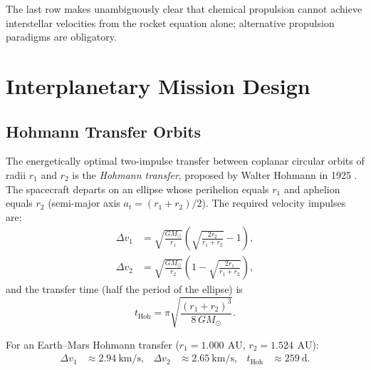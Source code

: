 \documentclass[12pt,a4paper]{article}
\newcommand{\AU}{\,\text{AU}}
\begin{document}
The last row makes unambiguously clear that chemical propulsion cannot achieve
interstellar velocities from the rocket equation alone; alternative
propulsion paradigms are obligatory.

\section{Interplanetary Mission Design}

\subsection{Hohmann Transfer Orbits}

The energetically optimal two-impulse transfer between coplanar circular
orbits of radii $r_1$ and $r_2$ is the \emph{Hohmann transfer}, proposed by
Walter Hohmann in 1925 \citep{Hohmann1925}. The spacecraft departs on an
ellipse whose perihelion equals $r_1$ and aphelion equals $r_2$
(semi-major axis $a_t = (r_1+r_2)/2$). The required velocity impulses are:
\begin{align}
  \Delta v_1 &= \sqrt{\frac{GM_\odot}{r_1}}
               \left(\sqrt{\frac{2r_2}{r_1+r_2}} - 1\right),
               \label{eq:dv1}\\
  \Delta v_2 &= \sqrt{\frac{GM_\odot}{r_2}}
               \left(1 - \sqrt{\frac{2r_1}{r_1+r_2}}\right),
               \label{eq:dv2}
\end{align}
and the transfer time (half the period of the ellipse) is
\begin{equation}
  t_{\mathrm{Hoh}} = \pi\sqrt{\frac{(r_1+r_2)^3}{8\,GM_\odot}}.
  \label{eq:thoh}
\end{equation}

For an Earth--Mars Hohmann transfer
($r_1 = \SI{1.000}{\AU}$, $r_2 = \SI{1.524}{\AU}$):
\begin{align*}
  \Delta v_1 &\approx \SI{2.94}{\kilo\meter\per\second}, &
  \Delta v_2 &\approx \SI{2.65}{\kilo\meter\per\second}, &
  t_{\mathrm{Hoh}} &\approx \SI{259}{\day}.
\end{align*}
\end{document}
